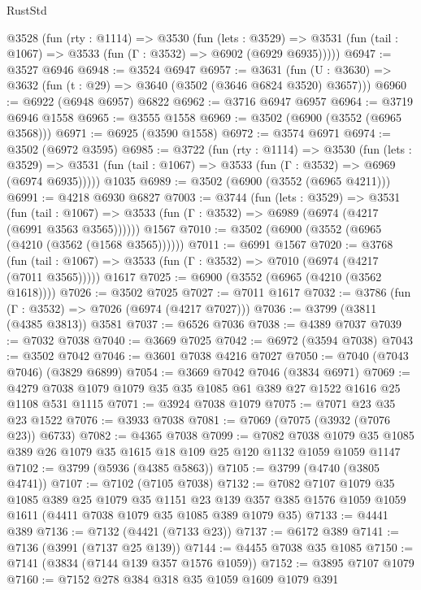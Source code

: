 \begin{lexlean}{RustStd}
\begin{coremodule}
  @3528
    (fun (rty : @1114) =>
    @3530
      (fun (lets : @3529) =>
      @3531 (fun (tail : @1067) => @3533 (fun (Γ : @3532) => @6902 (@6929 @6935)))))
@6947 := @3527 @6946
@6948 := @3524 @6947
@6957 := @3631 (fun (U : @3630) => @3632 (fun (t : @29) => @3640 (@3502 (@3646 @6824 @3520) @3657)))
@6960 := @6922 (@6948 @6957) @6822
@6962 := @3716 @6947 @6957
@6964 := @3719 @6946 @1558
@6965 := @3555 @1558
@6969 := @3502 (@6900 (@3552 (@6965 @3568)))
@6971 := @6925 (@3590 @1558)
@6972 := @3574 @6971
@6974 := @3502 (@6972 @3595)
@6985 := @3722
    (fun (rty : @1114) =>
    @3530
      (fun (lets : @3529) =>
      @3531 (fun (tail : @1067) => @3533 (fun (Γ : @3532) => @6969 (@6974 @6935)))))
    @1035
@6989 := @3502 (@6900 (@3552 (@6965 @4211)))
@6991 := @4218 @6930 @6827
@7003 := @3744
    (fun (lets : @3529) =>
    @3531
      (fun (tail : @1067) => @3533 (fun (Γ : @3532) => @6989 (@6974 (@4217 (@6991 @3563 @3565))))))
    @1567
@7010 := @3502 (@6900 (@3552 (@6965 (@4210 (@3562 (@1568 @3565))))))
@7011 := @6991 @1567
@7020 := @3768
    (fun (tail : @1067) => @3533 (fun (Γ : @3532) => @7010 (@6974 (@4217 (@7011 @3565)))))
    @1617
@7025 := @6900 (@3552 (@6965 (@4210 (@3562 @1618))))
@7026 := @3502 @7025
@7027 := @7011 @1617
@7032 := @3786 (fun (Γ : @3532) => @7026 (@6974 (@4217 @7027)))
@7036 := @3799 (@3811 (@4385 @3813)) @3581
@7037 := @6526 @7036
@7038 := @4389 @7037
@7039 := @7032 @7038
@7040 := @3669 @7025
@7042 := @6972 (@3594 @7038)
@7043 := @3502 @7042
@7046 := @3601 @7038 @4216 @7027
@7050 := @7040 (@7043 @7046) (@3829 @6899)
@7054 := @3669 @7042 @7046 (@3834 @6971)
@7069 := @4279 @7038 @1079 @1079 @35 @35 @1085 @61 @389 @27 @1522 @1616 @25 @1108 @531 @1115
@7071 := @3924 @7038 @1079
@7075 := @7071 @23 @35 @23 @1522
@7076 := @3933 @7038
@7081 := @7069 (@7075 (@3932 (@7076 @23)) @6733)
@7082 := @4365 @7038
@7099 := @7082
    @7038
    @1079
    @35
    @1085
    @389
    @26
    @1079
    @35
    @1615
    @18
    @109
    @25
    @120
    @1132
    @1059
    @1059
    @1147
@7102 := @3799 (@5936 (@4385 @5863))
@7105 := @3799 (@4740 (@3805 @4741))
@7107 := @7102 (@7105 @7038)
@7132 := @7082
    @7107
    @1079
    @35
    @1085
    @389
    @25
    @1079
    @35
    @1151
    @23
    @139
    @357
    @385
    @1576
    @1059
    @1059
    @1611
    (@4411 @7038 @1079 @35 @1085 @389 @1079 @35)
@7133 := @4441 @389
@7136 := @7132 (@4421 (@7133 @23))
@7137 := @6172 @389
@7141 := @7136 (@3991 (@7137 @25 @139))
@7144 := @4455 @7038 @35 @1085
@7150 := @7141 (@3834 (@7144 @139 @357 @1576 @1059))
@7152 := @3895 @7107 @1079
@7160 := @7152 @278 @384 @318 @35 @1059 @1609 @1079 @391

\end{coremodule}
\end{lexlean}
